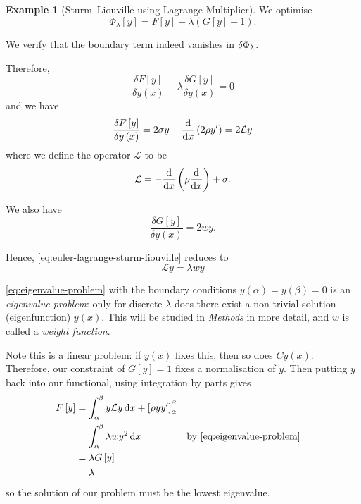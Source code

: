 \documentclass[11pt]{article}
\numberwithin{equation}{section}
\theoremstyle{definition}
\newtheorem{example}[theorem]{Example}
\theoremstyle{remark}
\newcommand{\pqty}[1]{\left(#1\right)}
\newcommand{\bqty}[1]{\left[#1\right]}
\newcommand{\fdv}[2]{\frac{\delta #1}{\delta #2}}
\begin{document}
\begin{example}[Sturm--Liouville using Lagrange Multiplier]\label{variation-unit-0053}
    We optimise
    \[
        \Phi_{\lambda} \bqty{y} = F\bqty{y} - \lambda \pqty{G\bqty{y} - 1}.
    \]

    We verify that the boundary term indeed vanishes in \(\var{\Phi_{\lambda}}\).

    Therefore,
    \begin{equation}
        \label{eq:euler-lagrange-sturm-liouville}
        \fdv{F\bqty{y}}{y\pqty{x}} - \lambda \fdv{G\bqty{y}}{y\pqty{x}} = 0
    \end{equation}
    and we have
    \[
        \fdv{F\bqty{y}}{y\pqty{x}} = 2 \sigma y - \dv{x} \pqty{2 \rho y'} = 2 \mathcal{L} y
    \]
    where we define the operator \(\mathcal{L}\) to be
    \[
        \mathcal{L} = - \dv{x} \pqty{\rho \dv{x}} + \sigma.
    \]

    We also have
    \[
        \fdv{G\bqty{y}}{y\pqty{x}} = 2 w y.
    \]

    Hence, \autoref{eq:euler-lagrange-sturm-liouville} reduces to
    \begin{equation}
        \label{eq:eigenvalue-problem}%
        \mathcal{L} y = \lambda w y
    \end{equation}

    \autoref{eq:eigenvalue-problem} with the boundary conditions \(y\pqty{\alpha} = y\pqty{\beta} = 0\) is an \emph{eigenvalue problem}: only for discrete \(\lambda\) does there exist a non-trivial solution (eigenfunction) \(y\pqty{x}\). This will be studied in \textit{Methods} in more detail, and \(w\) is called a \emph{weight function}.

    Note this is a linear problem: if \(y \pqty{x}\) fixes this, then so does \(C y \pqty{x}\). Therefore, our constraint of \(G\bqty{y} = 1\) fixes a normalisation of \(y\). Then putting \(y\) back into our functional, using integration by parts gives
    \begin{align*}
        F\bqty{y} &= \int_{\alpha}^{\beta} y \mathcal{L} y \dd{x} + \bqty{\rho y y'}_{\alpha}^{\beta} \\
        &= \int_{\alpha}^{\beta} \lambda w y^2 \dd{x} && \text{by \autoref{eq:eigenvalue-problem}} \\
        &= \lambda G\bqty{y} \\
        &= \lambda
    \end{align*}
    so the solution of our problem must be the lowest eigenvalue.
\end{example}
\end{document}
